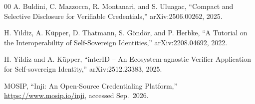 \documentclass[conference]{IEEEtran}
\begin{document}
\begin{thebibliography}{00}
 A. Buldini, C. Mazzocca, R. Montanari, and S. Uluagac, ``Compact and Selective Disclosure for Verifiable Credentials,'' arXiv:2506.00262, 2025.

 H. Yildiz, A. K\"upper, D. Thatmann, S. G\"ond\"or, and P. Herbke, ``A Tutorial on the Interoperability of Self-Sovereign Identities,'' arXiv:2208.04692, 2022.

 H. Yildiz and A. K\"upper, ``interID -- An Ecosystem-agnostic Verifier Application for Self-sovereign Identity,'' arXiv:2512.23383, 2025.

 MOSIP, ``Inji: An Open-Source Credentialing Platform,'' \url{https://www.mosip.io/inji}, accessed Sep.\ 2026.

\end{thebibliography}
\end{document}
